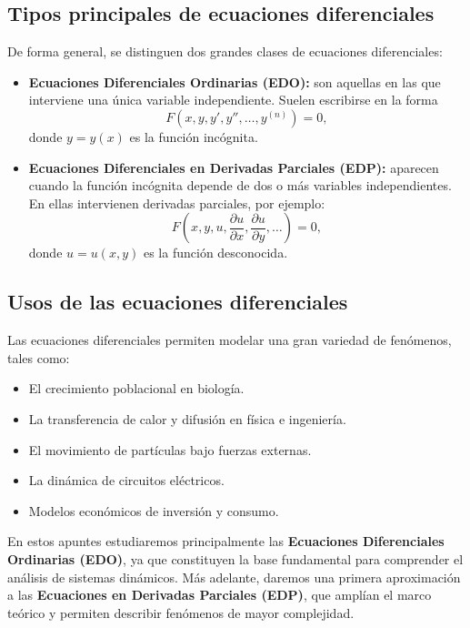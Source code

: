\subsection*{Tipos principales de ecuaciones diferenciales}

De forma general, se distinguen dos grandes clases de ecuaciones diferenciales:

\begin{itemize}
    \item \textbf{Ecuaciones Diferenciales Ordinarias (EDO):} son aquellas en las que interviene una 
    única variable independiente. Suelen escribirse en la forma
    \[
        F\left(x, y, y', y'', \dots, y^{(n)}\right) = 0,
    \]
    donde $y = y(x)$ es la función incógnita.
    
    \item \textbf{Ecuaciones Diferenciales en Derivadas Parciales (EDP):} aparecen cuando la función 
    incógnita depende de dos o más variables independientes. En ellas intervienen derivadas parciales, por ejemplo:
    \[
        F\left(x, y, u, \frac{\partial u}{\partial x}, \frac{\partial u}{\partial y}, \dots \right) = 0,
    \]
    donde $u = u(x,y)$ es la función desconocida.
\end{itemize}

\subsection*{Usos de las ecuaciones diferenciales}

Las ecuaciones diferenciales permiten modelar una gran variedad de fenómenos, tales como:

\begin{itemize}
    \item El crecimiento poblacional en biología.
    \item La transferencia de calor y difusión en física e ingeniería.
    \item El movimiento de partículas bajo fuerzas externas.
    \item La dinámica de circuitos eléctricos.
    \item Modelos económicos de inversión y consumo.
\end{itemize}

En estos apuntes estudiaremos principalmente las \textbf{Ecuaciones Diferenciales Ordinarias (EDO)}, 
ya que constituyen la base fundamental para comprender el análisis de sistemas dinámicos.  
Más adelante, daremos una primera aproximación a las \textbf{Ecuaciones en Derivadas Parciales (EDP)}, 
que amplían el marco teórico y permiten describir fenómenos de mayor complejidad.

